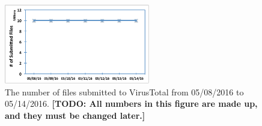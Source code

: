\begin{figure}[t!]
\begin{center}
\includegraphics[width=2.5in]{figure/submission_number}
\caption{The number of files submitted to VirusTotal from 05/08/2016 to 05/14/2016. 
{\bf [TODO: All numbers in this figure are made up, and they must be changed later.]}}
\label{fig:subnum}
\end{center}
\end{figure}
